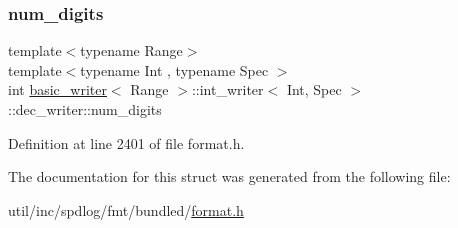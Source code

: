\subsubsection{\texorpdfstring{num\+\_\+digits}{num\_digits}}
{\footnotesize\ttfamily template$<$typename Range$>$ \\
template$<$typename Int , typename Spec $>$ \\
int \hyperlink{classbasic__writer}{basic\+\_\+writer}$<$ Range $>$\+::int\+\_\+writer$<$ Int, Spec $>$\+::dec\+\_\+writer\+::num\+\_\+digits}



Definition at line 2401 of file format.\+h.



The documentation for this struct was generated from the following file\+:\begin{DoxyCompactItemize}
\item 
util/inc/spdlog/fmt/bundled/\hyperlink{format_8h}{format.\+h}\end{DoxyCompactItemize}
